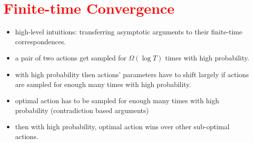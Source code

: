 \section{\textcolor{red}{Finite-time Convergence}}


\begin{itemize}
    \item high-level intuitions: transferring asymptotic arguments to their finite-time correspondences.
    \item a pair of two actions get sampled for $\Omega(\log{T})$ times with high probability.
    \item with high probability then actions' parameters have to shift largely if actions are sampled for enough many times with high probability.
    \item optimal action has to be sampled for enough many times with high probability (contradiction based arguments)
    \item then with high probability, optimal action wins over other sub-optimal actions.
\end{itemize}